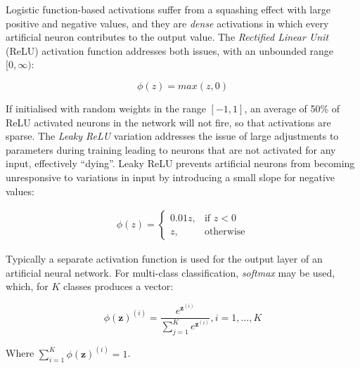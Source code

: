  Logistic function-based activations suffer from a squashing effect with large positive and negative values, and they are \emph{dense} activations in which every artificial neuron contributes to the output value. The \emph{Rectified Linear Unit} (ReLU) activation function addresses both issues, with an unbounded range $[0,\infty)$:

\begin{equation}
  \phi(z) = max(z, 0)
\end{equation}

 If initialised with random weights in the range $[-1,1]$, an average of 50\% of ReLU activated neurons in the network will not fire, so that activations are sparse.
The \emph{Leaky ReLU} variation addresses the issue of large adjustments to parameters during training leading to neurons that are not activated for any input, effectively ``dying''. Leaky ReLU prevents artificial neurons from becoming unresponsive to variations in input by introducing a small slope for negative values:

\begin{align}
  \phi(z) =
    \begin{cases}
      0.01z, & \text{if } z < 0\\
      z, & \text{otherwise}
    \end{cases}
\end{align}

Typically a separate activation function is used for the output layer of an artificial neural network. For multi-class classification, \emph{softmax} may be used, which, for $K$ classes produces a vector:

\begin{equation}
  \phi(\bm{z})^{(i)} = \frac{e^{\bm{z}^{(i)}}}{\sum_{j=1}^{K} e^{\bm{z}^{(i)}}}, i = 1, \ldots, K
\end{equation}

Where $\sum_{i=1}^{K} \phi (\bm{z})^{(i)} = 1$.

